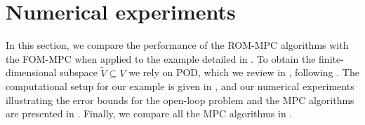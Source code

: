 \documentclass[reqno]{amsart}
\newcommand{\reduce}[1]{\tilde{#1}}
\newcommand{\Vred}{\reduce{V}}
\newcommand{\abbr}[1]{\textsf{#1}\xspace}
\newcommand{\FOM}{\abbr{FOM}}
\newcommand{\ROM}{\abbr{ROM}}
\newcommand{\MPC}{\abbr{MPC}}
\newcommand{\POD}{\abbr{POD}} %
\begin{document}
\section{Numerical experiments}
\label{sec:numerics}
%
In this section, we compare the performance of the \ROM-\MPC algorithms with the \FOM-\MPC when applied to the example detailed in . To obtain the finite-dimensional subspace $\Vred\subseteq V$ we rely on \POD, which we review in , following \cite{GubV17,BBMV24}. The computational setup for our example is given in , and our numerical experiments illustrating the error bounds for the open-loop problem and the \MPC algorithms are presented in . Finally, we compare all the \MPC algorithms in .\\
%
\vspace{0.2cm}
\noindent{}\\[.2em]

\end{document}
